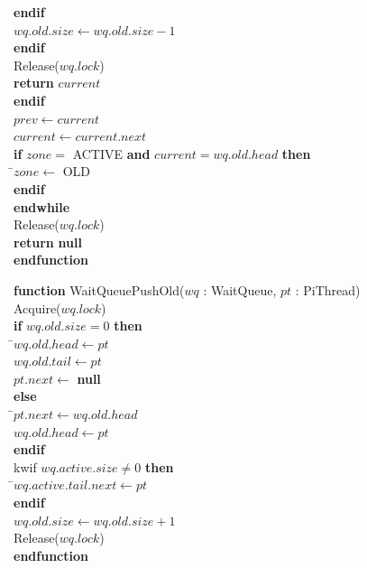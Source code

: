\documentclass[a4paper,11pt]{article}
\newenvironment{program}{
  \begin{sffamily}
  \begin{scriptsize}
  \begin{tabbing}}
 {\end{tabbing}
  \end{scriptsize}
  \end{sffamily}}
\newcommand{\kw}[1]{\textsf{\textbf{#1}}}
\newcommand{\pindent}{\hspace{2em}\=}
\newcommand{\synchro}[1]{\textcolor{synchrocolor}{#1}}
\begin{document}
\begin{program}
  \>\>\>\>\kw{endif} \\
  \>\>\>\>$wq.old.size \leftarrow wq.old.size - 1$ \\
  \>\>\>\kw{endif} \\
  \>\>\>\synchro{Release($wq.lock$)} \\
  \>\>\>\kw{return} $current$ \\
  \>\>\kw{endif} \\
  \>\>$prev \leftarrow current$ \\
  \>\>$current \leftarrow current.next$ \\
  \>\>\kw{if} $zone =$ ACTIVE \kw{and} $current = wq.old.head$ \kw{then} \\
  \>\>\pindent$zone \leftarrow$ OLD \\
  \>\>\kw{endif} \\
  \>\kw{endwhile} \\
  \>\synchro{Release($wq.lock$)} \\
  \>\kw{return} \kw{null} \\
  \kw{endfunction}
\end{program}

\label{WaitQueuePushOld}
\begin{program}
  \kw{function} WaitQueuePushOld($wq$ : WaitQueue, $pt$ : PiThread) \\
  \pindent\synchro{Acquire($wq.lock$)} \\
  \>\kw{if} $wq.old.size = 0$ \kw{then} \\
  \>\pindent$wq.old.head \leftarrow pt$ \\
  \>\>$wq.old.tail \leftarrow pt$ \\
  \>\>$pt.next \leftarrow$ \kw{null} \\
  \>\kw{else} \\
  \>\pindent$pt.next \leftarrow wq.old.head$ \\
  \>\>$wq.old.head \leftarrow pt$ \\
  \>\kw{endif} \\
  \>kw{if} $wq.active.size \neq 0$ \kw{then} \\
  \>\pindent$wq.active.tail.next \leftarrow pt$ \\
  \>\kw{endif} \\
  \>$wq.old.size \leftarrow wq.old.size + 1$ \\
  \>\synchro{Release($wq.lock$)} \\
  \kw{endfunction}
\end{program}
\end{document}
